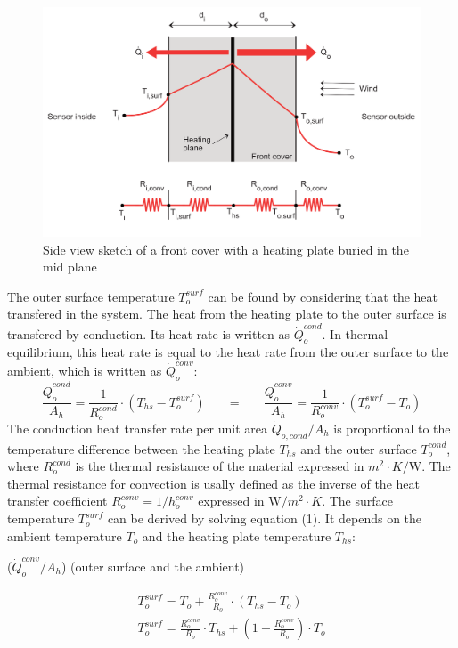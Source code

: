 \begin{figure} [H]
	\centering
	\includegraphics[scale=0.75]{Pictures/Model.png}
	\caption[Front Cover Heat Transfer Model]{Side view sketch of a front cover with a heating plate buried in the mid plane}
	\label{fig:platemodel}
\end{figure}
The outer surface temperature \(T_o^{surf}\) can be found by considering that the heat transfered in the system. The heat from the heating plate to the outer surface is transfered by conduction. Its heat rate is written as \(\dot Q_o^{cond}\). In thermal equilibrium, this heat rate is equal to the heat rate from the outer surface to the ambient, which is written as \(\dot Q_o^{conv}\):
\begin{equation}
\frac{\dot Q_o^{cond}}{A_h} = \frac{1}{R_o^{cond}}\cdot (T_{hs}-T_o^{surf}) \;\;\;\;\;\; = \;\;\;\;\;\;\frac{\dot Q_o^{conv}}{A_h} = \frac{1}{R_o^{conv}}\cdot (T_o^{surf}-T_{o})
\end{equation}
The conduction heat transfer rate per unit area \(\dot Q_{o,cond}/A_h\) is proportional to the temperature difference between the heating plate $T_{hs}$ and the outer surface \(T_o^{cond}\), where \(R_o^{cond}\) is the thermal resistance of the material expressed in \(m^2\cdot K/\mathrm{W}\). The thermal resistance for convection is usally defined as the inverse of the heat transfer coefficient \(R_o^{conv} = 1/h_o^{conv}\) expressed in \(\mathrm{W}/m^2\cdot K\). The surface temperature $T_o^{surf}$ can be derived by solving equation (1). It depends on the ambient temperature $T_o$ and the heating plate temperature $T_{hs}$:

(\(\dot Q_o^{conv}/A_h\)) 
(outer surface and the ambient)


\begin{eqnarray}
T_o^{surf} = T_o + \frac{R_o^{conv}}{R_{o}}\cdot(T_{hs}-T_o) \\
T_o^{surf} = \frac{R_o^{conv}}{R_{o}}\cdot T_{hs} + (1-\frac{R_o^{conv}}{R_{o}})\cdot T_o
\end{eqnarray}

